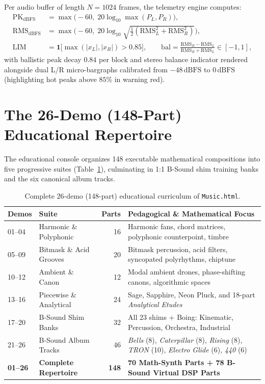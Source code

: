 \begin{definition}
Per audio buffer of length $N = 1024$ frames, the telemetry engine computes:
\begin{align}
\mathrm{PK}_{\mathrm{dBFS}} &= \max\!\big(-60,\; 20\log_{10}\max(P_L, P_R)\big), \\
\mathrm{RMS}_{\mathrm{dBFS}} &= \max\!\Big(-60,\; 20\log_{10}\sqrt{\tfrac{1}{2}(\mathrm{RMS}_L^2 + \mathrm{RMS}_R^2)}\Big), \\
\mathrm{LIM} &= \mathbf{1}\big[\max(|x_L|, |x_R|) > 0.85\big], \qquad
\mathrm{bal} = \frac{\mathrm{RMS}_R - \mathrm{RMS}_L}{\mathrm{RMS}_R + \mathrm{RMS}_L} \in [-1, 1],
\end{align}
with ballistic peak decay $0.84$ per block and stereo balance indicator rendered alongside dual L/R micro-bargraphs calibrated from $-48\,\text{dBFS}$ to $0\,\text{dBFS}$ (highlighting hot peaks above $85\%$ in warning red).
\end{definition}

\section{The 26-Demo (148-Part) Educational Repertoire}

The educational console organizes 148 executable mathematical compositions into five progressive suites (Table~\ref{tab:edu-repertoire}), culminating in 1:1 B-Sound shim training banks and the six canonical album tracks.

\begin{table}[htbp]
\centering
\caption{Complete 26-demo (148-part) educational curriculum of \texttt{Music.html}.}
\label{tab:edu-repertoire}
\scriptsize
\begin{tabular}{@{}llrl@{}}
\toprule
Demos & Suite & Parts & Pedagogical \& Mathematical Focus \\
\midrule
01--04 & Harmonic \& Polyphonic & 16 & Harmonic fans, chord matrices, polyphonic counterpoint, timbre \\
05--09 & Bitmask \& Acid Grooves & 20 & Bitmask percussion, acid filters, syncopated polyrhythms, chiptune \\
10--12 & Ambient \& Canon & 12 & Modal ambient drones, phase-shifting canons, algorithmic spaces \\
13--16 & Piecewise \& Analytical & 24 & Sage, Sapphire, Neon Pluck, and 18-part \emph{Analytical Etudes} \\
17--20 & B-Sound Shim Banks & 32 & All 23 shims + Boing: Kinematic, Percussion, Orchestra, Industrial \\
21--26 & B-Sound Album Tracks & 46 & \emph{Bells} (8), \emph{Caterpillar} (8), \emph{Rising} (8), \emph{TRON} (10), \emph{Electro Glide} (6), \emph{440} (6) \\
\midrule
\textbf{01--26} & \textbf{Complete Repertoire} & \textbf{148} & \textbf{70 Math-Synth Parts + 78 B-Sound Virtual DSP Parts} \\
\bottomrule
\end{tabular}
\end{table}

